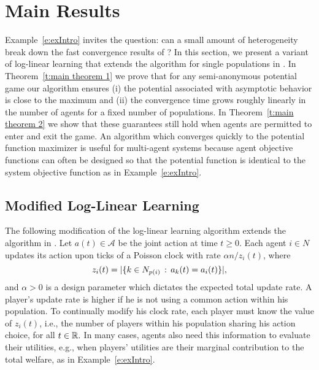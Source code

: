 \section{Main Results}

Example~\ref{e:exIntro} invites the question: can a small amount of heterogeneity break down the fast convergence results of \cite{Shah2010}? In this section, we present a variant of log-linear learning \cite{Blume1993} that extends the algorithm for single populations in \cite{Shah2010}.  In Theorem~\ref{t:main theorem 1} we prove that for any semi-anonymous potential game our algorithm ensures (i) the potential associated with asymptotic behavior is close to the maximum and (ii) the convergence time grows roughly linearly in the number of agents for a fixed number of populations.  In Theorem~\ref{t:main theorem 2} we show that these guarantees still hold when agents are permitted to enter and exit the game.  An algorithm which converges quickly to the potential function maximizer is useful for multi-agent systems because agent objective functions can often be designed so that the potential function is identical to the system objective function as in Example~\ref{e:exIntro}.

\subsection{Modified Log-Linear Learning}\label{s:alg description}
The following modification of the log-linear learning algorithm extends the algorithm in \cite{Shah2010}.
Let $a(t)\in\mathcal{A}$ be the joint action at time $t \geq 0$.  Each agent $i \in N$ updates its action upon ticks of a Poisson clock with rate $\alpha n/z_i(t)$, where 
%
$$z_i(t) = |\{k\in N_{p(i)} \,:\, a_k(t) = a_i(t)\}|,$$
%
and $\alpha > 0$ is a design parameter which dictates the expected total update rate.  
A player's update rate is higher if he is not using a common action within his population. To continually modify his clock rate, each player must know the value of $z_i(t)$, i.e., the number of players within his population sharing his action choice, for all $t\in \mathbb{R}.$  In many cases, agents also need this information to evaluate their utilities, e.g., when players' utilities are their marginal contribution to the total welfare, as in Example~\ref{e:exIntro}. 
   
